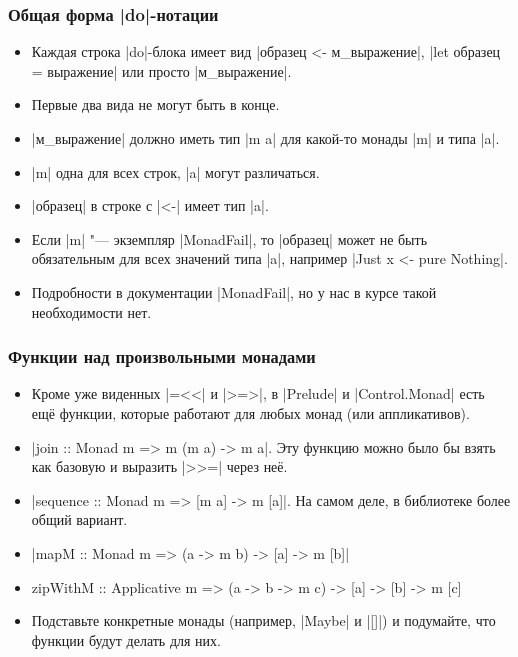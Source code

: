\documentclass[11pt]{beamer}
\begin{document}
\begin{frame}[fragile]
  \frametitle{Общая форма \haskinline|do|-нотации}
  \begin{itemize}
    \item Каждая строка \haskinline|do|-блока имеет вид \haskinline|образец <- м_выражение|, \haskinline|let образец = выражение| или просто \haskinline|м_выражение|.
    \item Первые два вида не могут быть в конце.
    \item \haskinline|м_выражение| должно иметь тип \haskinline|m a| для какой-то монады \haskinline|m| и типа \haskinline|a|.
    \item \haskinline|m| одна для всех строк, \haskinline|a| могут различаться.
    \item \haskinline|образец| в строке с \haskinline|<-| имеет тип \haskinline|a|.
    \item Если \haskinline|m| "--- экземпляр \haskinline|MonadFail|, то \haskinline|образец| может не быть обязательным для всех значений типа \haskinline|a|, например \haskinline|Just x <- pure Nothing|.
    \item Подробности в документации \haskinline|MonadFail|, но у нас в курсе такой необходимости нет.
  \end{itemize}
\end{frame}

\begin{frame}[fragile]
  \frametitle{Функции над произвольными монадами}
  \begin{itemize}[<+->]
    \item Кроме уже виденных \haskinline|=<<| и \haskinline|>=>|, в \haskinline|Prelude| и \haskinline|Control.Monad| есть ещё функции, которые работают для любых монад (или аппликативов).
    \item \haskinline|join :: Monad m => m (m a) -> m a|. Эту функцию можно было бы взять как базовую и выразить \haskinline|>>=| через неё.
    \item \haskinline|sequence :: Monad m => [m a] -> m [a]|. На самом деле, в библиотеке более общий вариант.
    \item \haskinline[fontsize=\small]|mapM :: Monad m => (a -> m b) -> [a] -> m [b]|
    \item
          \begin{haskell}
    zipWithM :: Applicative m =>
      (a -> b -> m c) -> [a] -> [b] -> m [c]
    \end{haskell}
    \item Подставьте конкретные монады (например, \haskinline|Maybe| и \haskinline|[]|) и подумайте, что функции будут делать для них.
  \end{itemize}
\end{frame}
\end{document}
